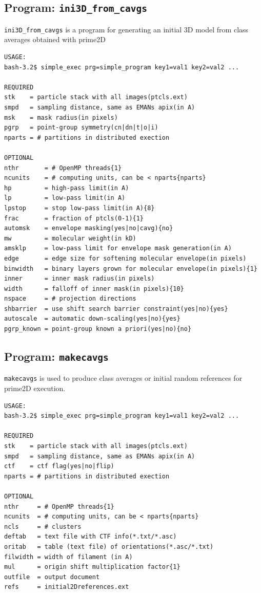 \documentclass[a4paper,11pt]{article}
\newcommand{\prgname}[1]{\textcolor{NavyBlue}{\texttt{#1}}}
\begin{document}
\subsection{Program: \prgname{ini3D\_from\_cavgs}}
\label{ini3D_from_cavgs}
\prgname{ini3D\_from\_cavgs} is a program for generating an initial 3D model from class averages obtained with prime2D

\begin{verbatim}
USAGE:
bash-3.2$ simple_exec prg=simple_program key1=val1 key2=val2 ...

REQUIRED
stk    = particle stack with all images(ptcls.ext)
smpd   = sampling distance, same as EMANs apix(in A)
msk    = mask radius(in pixels)
pgrp   = point-group symmetry(cn|dn|t|o|i)
nparts = # partitions in distributed exection

OPTIONAL
nthr       = # OpenMP threads{1}
ncunits    = # computing units, can be < nparts{nparts}
hp         = high-pass limit(in A)
lp         = low-pass limit(in A)
lpstop     = stop low-pass limit(in A){8}
frac       = fraction of ptcls(0-1){1}
automsk    = envelope masking(yes|no|cavg){no}
mw         = molecular weight(in kD)
amsklp     = low-pass limit for envelope mask generation(in A)
edge       = edge size for softening molecular envelope(in pixels)
binwidth   = binary layers grown for molecular envelope(in pixels){1}
inner      = inner mask radius(in pixels)
width      = falloff of inner mask(in pixels){10}
nspace     = # projection directions
shbarrier  = use shift search barrier constraint(yes|no){yes}
autoscale  = automatic down-scaling(yes|no){yes}
pgrp_known = point-group known a priori(yes|no){no}
\end{verbatim}

\subsection{Program: \prgname{makecavgs}}
\label{makecavgs}
\prgname{makecavgs} is used  to produce class averages or initial random references for prime2D execution. 

\begin{verbatim}
USAGE:
bash-3.2$ simple_exec prg=simple_program key1=val1 key2=val2 ...

REQUIRED
stk    = particle stack with all images(ptcls.ext)
smpd   = sampling distance, same as EMANs apix(in A)
ctf    = ctf flag(yes|no|flip)
nparts = # partitions in distributed exection

OPTIONAL
nthr     = # OpenMP threads{1}
ncunits  = # computing units, can be < nparts{nparts}
ncls     = # clusters
deftab   = text file with CTF info(*.txt/*.asc)
oritab   = table (text file) of orientations(*.asc/*.txt)
filwidth = width of filament (in A)
mul      = origin shift multiplication factor{1}
outfile  = output document
refs     = initial2Dreferences.ext
\end{verbatim}
\end{document}
